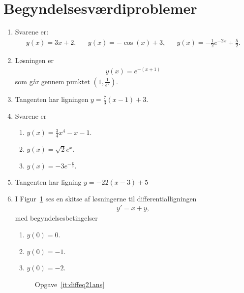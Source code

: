 \section{Begyndelsesværdiproblemer}
\begin{enumerate}
	\item Svarene er:
	\begin{align*}
	y(x)=3x+2,&&y(x)=-\cos(x)+3,&&y(x)=-\frac{1}{2}e^{-2x}+\frac{5}{2}.
	\end{align*}
	
	\item Løsningen er
	\begin{align*}
	y(x)=e^{-(x+1)}
	\end{align*}
	som går gennem punktet $(1,\frac{1}{e^2})$. 
	
	\item Tangenten har ligningen $y=\frac{7}{3}(x-1)+3$.

	\item Svarene er
\begin{enumerate}
	\item $y(x)=\frac{3}{4}x^4-x-1$.
	\item $y(x)=\sqrt{2}e^{x}$.
	\item $y(x)=-3e^{-\frac{x}{3}}$.
\end{enumerate}	
	
		\item Tangenten har ligning $y=-22(x-3)+5$
		
		\item\label{it:diffeq21ans} I Figur~\ref{fig:diffeq21ans} ses en skitse af løsningerne til differentialligningen
	\begin{align*}
	y'=x+y,
	\end{align*}
	med begyndelsesbetingelser
	\begin{enumerate}
		\item $y(0)=0$.
		\item $y(0)=-1$.
		\item $y(0)=-2$.
	\end{enumerate}
	
	
	\begin{figure}
		\centering
		\caption{Opgave~\ref{it:diffeq21ans}}
		\label{fig:diffeq21ans}
	\end{figure}
	

\end{enumerate}
